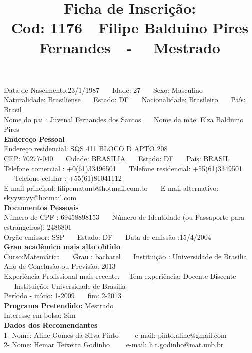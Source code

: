 \documentclass[11pt]{article}
\title{\vspace*{-4cm} Ficha de Inscrição: \\Cod: 1176\ \ Filipe Balduino Pires Fernandes\ \ - \ \ Mestrado 
 }
\date{}
\begin{document}
\maketitle
\vspace*{-1.5cm}
\noindent Data de Nascimento:23/1/1987
\ \ \ Idade: 27   \ \ \ Sexo: Masculino
\\
Naturalidade: Brasiliense  
\ \ \  Estado: DF
\ \ \  Nacionalidade: Brasileiro
\ \ \ País: Brasil
\\        
Nome do pai : Juvenal Fernandes dos Santos
\ \ \ Nome da mãe: Elza Balduino Pires          
\\[0.2cm]                     
\textbf{Endereço Pessoal} 
\\ 
\noindent Endereço residencial: SQS 411 BLOCO D APTO 208
\\
        CEP: 70277-040 
\ \ \ Cidade: BRASILIA 
\ \ \ Estado: DF 
\ \ \ País: BRASIL
\\		
		Telefone comercial : +0(61)33496501
\ \ \ Telefone residencial: +55(61)3349501
\ \ \ Telefone celular : +55(61)81041112
\\
E-mail principal: filipematunb@hotmail.com.br
\ \ \ E-mail alternativo: skyywayy@hotmail.com 
\\[0.2cm] 
\textbf{Documentos Pessoais}
\\
\noindent Número de CPF : 69458898153
\ \ \ Número de Identidade (ou Passaporte para estrangeiros): 2486801
\\
Orgão emissor: SSP
\ \ \ Estado: DF
\ \ \ Data de emissão :15/4/2004
\\[0.3cm]
\textbf{Grau acadêmico mais alto obtido}
\\	
Curso:Matemática
\ \ \ Grau : bacharel
\ \ \ Instituição : Universidade de Brasilia
\\			
Ano de Conclusão ou Previsão: 2013
\\ 
Experiência Profissional mais recente. \ \  
Tem experiência: Docente Discente  
\ \ \ Instituição: Universidade de Brasilia
\\  
Período - início: 1-2009
\ \ \ fim: 2-2013
\\[0.2cm] 
\textbf{Programa Pretendido:} Mestrado\\
Interesse em bolsa: Sim
\\[0.3cm]		
\textbf{Dados dos Recomendantes} 
\\
1- Nome: Aline Gomes da Silva Pinto
\ \ \ \  e-mail: pinto.aline@gmail.com 
\\
2- Nome: Hemar Teixeira Godinho
\ \ \ \ e-mail: h.t.godinho@mat.unb.br
\\
\end{document}
